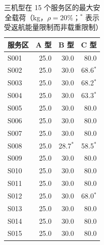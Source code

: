 \begin{table}[htbp]
\centering
\caption{运输无人机 A/B/C 与中继无人机 R 的主要参数（$m_0$ 为含电池空载质量）}
\label{tab:types}
\footnotesize
{}
\end{table}

\begin{table}[htbp]
\centering
\caption{三机型在 15 个服务区的最大安全载荷（kg，$\rho=20\%$；$^{*}$ 表示受返航能量限制而非载重限制）}
\label{tab:payload}
\footnotesize
\begin{tabular}{lrrr}
\toprule
服务区 & A 型 & B 型 & C 型 \\
\midrule
S001 & 25.0 & 30.0 & 80.0 \\
S002 & 25.0 & 30.0 & 68.6$^{*}$ \\
S003 & 25.0 & 30.0 & 68.2$^{*}$ \\
S004 & 25.0 & 30.0 & 63.3$^{*}$ \\
S005 & 25.0 & 30.0 & 80.0 \\
S006 & 25.0 & 30.0 & 80.0 \\
S007 & 25.0 & 30.0 & 80.0 \\
S008 & 25.0 & 28.7$^{*}$ & 58.5$^{*}$ \\
S009 & 25.0 & 30.0 & 80.0 \\
S010 & 25.0 & 30.0 & 80.0 \\
S011 & 25.0 & 30.0 & 80.0 \\
S012 & 25.0 & 30.0 & 68.0$^{*}$ \\
S013 & 25.0 & 30.0 & 80.0 \\
S014 & 25.0 & 30.0 & 80.0 \\
S015 & 25.0 & 30.0 & 80.0 \\
\bottomrule
\end{tabular}
\end{table}

